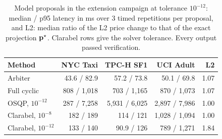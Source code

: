\begin{table}[h]
\centering
\caption{Model proposals in the extension campaign at tolerance $10^{-12}$: median / p95 latency in ms over 3 timed repetitions per proposal, and L2: median ratio of the L2 price change to that of the exact projection $\mathbf{p}^{\star}$. Clarabel rows give the solver tolerance. Every output passed verification.}
\label{tab:ext-projection}
\footnotesize
\setlength{\tabcolsep}{4pt}
\begin{tabular}{@{}lrrrr@{}}
\toprule
Method & NYC Taxi & TPC-H SF1 & UCI Adult & L2 \\
\midrule
Arbiter & 43.6 / 82.9 & 57.2 / 73.8 & 50.1 / 69.8 & 1.07 \\
Full cyclic & 808 / 1{,}018 & 703 / 1{,}165 & 870 / 1{,}073 & 1.07 \\
OSQP, $10^{-12}$ & 287 / 7{,}258 & 5{,}931 / 6{,}025 & 2{,}897 / 7{,}986 & 1.00 \\
Clarabel, $10^{-8}$ & 182 / 189 & 114 / 121 & 1{,}028 / 1{,}094 & 1.00 \\
Clarabel, $10^{-12}$ & 133 / 140 & 90.9 / 126 & 789 / 1{,}271 & 1.84 \\
\bottomrule
\end{tabular}
\end{table}
